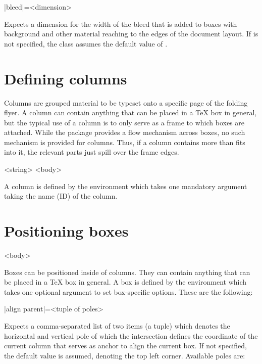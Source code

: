 \documentclass[a4paper]{article}
\begin{document}
\begin{macrodef}
|bleed|={<dimension>}
\end{macrodef}
Expects a dimension for the width of the bleed that is added to boxes with background and other material reaching to the edges of the document layout. If  is not specified, the class assumes the default value of \macro{3mm}.

\section{Defining columns}

Columns are grouped material to be typeset onto a specific page of the folding flyer. A column can contain anything that can be placed in a TeX box in general, but the typical use of a column is to only serve as a frame to which boxes are attached. While the package provides a flow mechanism across boxes, no such mechanism is provided for columns. Thus, if a column contains more than fits into it, the relevant parts just spill over the frame edges.

\begin{macrodef}
\null\begin{|leporellocolumn|}{<string>}
  <body>
\end{|leporellocolumn|}
\end{macrodef}
A column is defined by the  environment which takes one mandatory argument taking the name (ID) of the column.

\section{Positioning boxes}

\begin{macrodef}
\null\begin{|leporellobox|}[<options>]
  <body>
\end{|leporellobox|}
\end{macrodef}
Boxes can be positioned inside of columns. They can contain anything that can be placed in a TeX box in general. A box is defined by the  environment which takes one optional argument to set box-specific options. These are the following:

\begin{macrodef}
|align parent|={<tuple of poles>}
\end{macrodef}
Expects a comma-separated list of two items (a tuple) which denotes the horizontal and vertical pole of which the intersection defines the coordinate of the current column that serves as anchor to align the current box. If not specified, the default value  is assumed, denoting the top left corner. Available poles are:
\end{document}
